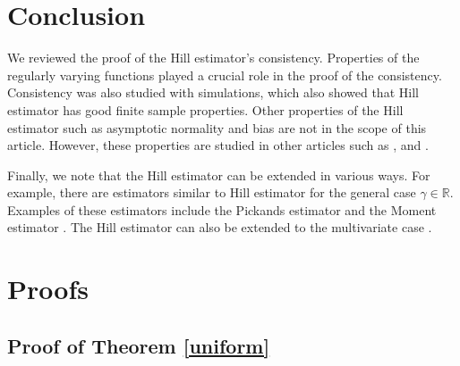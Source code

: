 \documentclass[english,12pt,a4paper,pdftex,sci,utf8]{aaltothesis} %
\begin{document}
\clearpage
\section{Conclusion}
\label{conclusion}

We reviewed the proof of the Hill estimator's consistency. Properties of the regularly varying functions played a crucial role in the proof of the consistency. Consistency was also studied with simulations, which also showed that Hill estimator has good finite sample properties. Other properties of the Hill estimator such as asymptotic normality and bias are not in the scope of this article. However, these properties are studied in other articles such as \cite{peng}, \cite{hausler} and \cite{haanResnick}.

Finally, we note that the Hill estimator can be extended in various ways. For example, there are estimators similar to Hill estimator for the general case $\gamma \in \mathbb{R}$. Examples of these estimators include the Pickands estimator \cite{pickands} and the Moment estimator \cite{dekkers}. The Hill estimator can also be extended to the multivariate case \cite{ilmonen}.

\clearpage





\thesisbibliography





\clearpage

\thesisappendix


\section{Proofs}
\label{proofs}
\subsection{Proof of Theorem \ref{uniform}}
\end{document}
